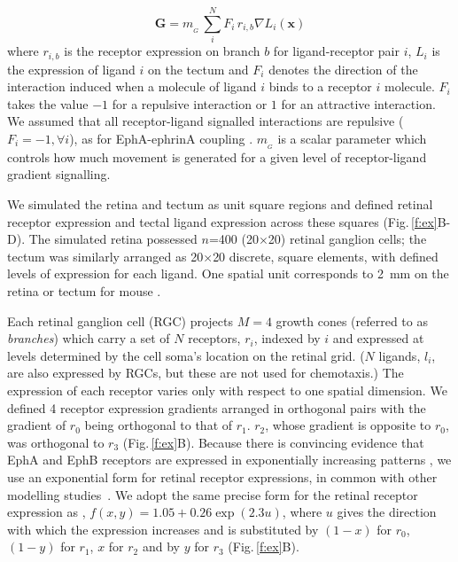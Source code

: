 \documentclass[11pt, a4paper]{article}
\begin{document}
\begin{equation}\label{e:G}
\mathbf{G} = m_{\!_G}\,\sum_i^N F_i\,r_{i,b} \nabla L_i(\mathbf{x})
\end{equation}
%
where $r_{i,b}$ is the receptor expression on branch $b$ for ligand-receptor pair $i$, $L_i$ is the expression of ligand $i$ on the tectum and $F_i$ denotes the direction of the interaction induced when a molecule of ligand $i$ binds to a receptor $i$ molecule.
$F_i$ takes the value $-1$ for a repulsive interaction or $1$ for an attractive interaction.
%
We assumed that all receptor-ligand signalled interactions are repulsive ($F_i=-1, \forall i$), as for EphA-ephrinA coupling \citep{drescher_vitro_1995,nakamoto_topographically_1996}.
%
$m_{\!_G}$ is a scalar parameter which controls how much movement is generated for a given level of receptor-ligand gradient signalling.

We simulated the retina and tectum as unit square regions and defined retinal receptor expression and tectal ligand expression across these squares (Fig.\,\ref{f:ex}B-D).
The simulated retina possessed $n$=400 (20$\times$20) retinal ganglion cells; the tectum was similarly arranged as 20$\times$20 discrete, square elements, with defined levels of expression for each ligand.
One spatial unit corresponds to 2~mm on the retina or tectum for mouse \citep{reber_relative_2004}.

Each retinal ganglion cell (RGC) projects $M=4$ growth cones (referred to as \emph{branches}) which carry a set of $N$ receptors, $r_i$, indexed by $i$ and expressed at levels determined by the cell soma's location on the retinal grid.
($N$ ligands, $l_i$, are also expressed by RGCs, but these are not used for chemotaxis.)
The expression of each receptor varies only with respect to one spatial dimension.
%
We defined 4 receptor expression gradients arranged in orthogonal pairs with the gradient of $r_0$ being orthogonal to that of $r_1$. $r_2$, whose gradient is opposite to $r_0$, was orthogonal to $r_3$ (Fig.\,\ref{f:ex}B).
%
Because there is convincing evidence that EphA and EphB receptors are expressed in exponentially increasing patterns \citep{reber_relative_2004,feldheim_genetic_2000,brown_topographic_2000,koulakov_stochastic_2004}, we use an exponential form for retinal receptor expressions, in common with other modelling studies~\citep{reber_relative_2004,koulakov_stochastic_2004,simpson_simple_2011}.
We adopt the same precise form for the retinal receptor expression as \citet{simpson_simple_2011}, $f(x,y) = 1.05 + 0.26 \exp(2.3 u)$, where $u$ gives the direction with which the expression increases and is substituted by $(1-x)$ for $r_0$, $(1-y)$ for $r_1$, $x$ for $r_2$ and by $y$ for $r_3$ (Fig.\,\ref{f:ex}B).
\end{document}
